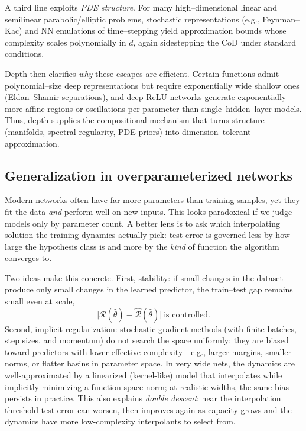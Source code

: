 A third line exploits \emph{PDE structure}. For many high–dimensional linear and
semilinear parabolic/elliptic problems, stochastic representations (e.g., Feynman–Kac)
and NN emulations of time–stepping yield approximation bounds whose complexity
scales polynomially in $d$, again sidestepping the CoD under standard conditions.

Depth then clarifies \emph{why} these escapes are efficient. Certain functions admit
polynomial–size deep representations but require exponentially wide shallow ones
(Eldan–Shamir separations), and deep ReLU networks generate exponentially more
affine regions or oscillations per parameter than single–hidden–layer models. Thus,
depth supplies the compositional mechanism that turns structure (manifolds,
spectral regularity, PDE priors) into dimension–tolerant approximation.
\subsection{Generalization in overparameterized networks}
\label{sec:generalization}

Modern networks often have far more parameters than training samples, yet they fit the data \emph{and} perform well on new inputs. This looks paradoxical if we judge models only by parameter count. A better lens is to ask which interpolating solution the training dynamics actually pick: test error is governed less by how large the hypothesis class is and more by the \emph{kind} of function the algorithm converges to.

Two ideas make this concrete. First, stability: if small changes in the dataset produce only small changes in the learned predictor, the train–test gap remains small even at scale,
\[
\bigl|\mathcal{R}(\hat\theta)-\hat{\mathcal{R}}(\hat\theta)\bigr| \ \text{is controlled}.
\]
Second, implicit regularization: stochastic gradient methods (with finite batches, step sizes, and momentum) do not search the space uniformly; they are biased toward predictors with lower effective complexity—e.g., larger margins, smaller norms, or flatter basins in parameter space. In very wide nets, the dynamics are well-approximated by a linearized (kernel-like) model that interpolates while implicitly minimizing a function-space norm; at realistic widths, the same bias persists in practice. This also explains \emph{double descent}: near the interpolation threshold test error can worsen, then improves again as capacity grows and the dynamics have more low-complexity interpolants to select from.

